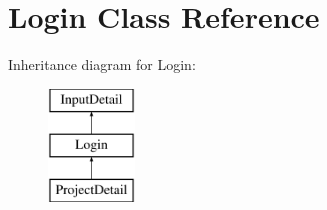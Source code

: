 \hypertarget{classLogin}{\section{Login Class Reference}
\label{classLogin}
}
Inheritance diagram for Login\-:\begin{figure}[H]
\begin{center}
\leavevmode
\includegraphics[height=3.000000cm]{dd/dfd/classLogin}
\end{center}
\end{figure}
